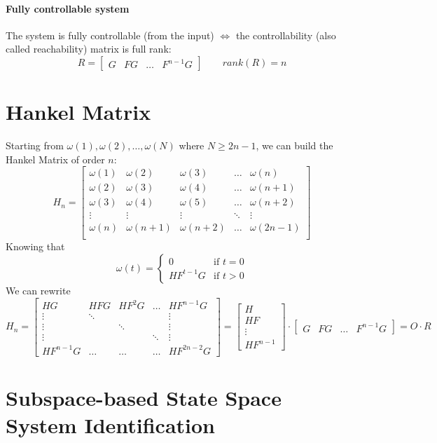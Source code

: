 \documentclass{article}
\begin{document}
\paragraph{Fully controllable system} The system is fully controllable (from the input) $\iff$ the controllability (also called reachability) matrix is full rank:
\[
R=\begin{bmatrix}
G&FG&\dots&F^{n-1}G
\end{bmatrix}
\qquad
rank(R)=n
\]

\section{Hankel Matrix}
Starting from $\omega(1),\omega(2),\dots,\omega(N)$ where $N\geq 2n-1$, we can build the Hankel Matrix of order $n$:
\[
H_n=\begin{bmatrix}
\omega(1)&\omega(2)&\omega(3)&\dots&\omega(n)\\
\omega(2)&\omega(3)&\omega(4)&\dots&\omega(n+1)\\
\omega(3)&\omega(4)&\omega(5)&\dots&\omega(n+2)\\
\vdots&\vdots&\vdots&\ddots&\vdots\\
\omega(n)&\omega(n+1)&\omega(n+2)&\dots&\omega(2n-1)\\
\end{bmatrix}
\]
Knowing that
\[
\omega(t)=
\begin{cases}
0&\text{if }t=0\\
HF^{t-1}G&\text{if }t>0
\end{cases}
\]
We can rewrite
\[
H_n=
\begin{bmatrix}
HG&HFG&HF^2G&\dots&HF^{n-1}G\\
\vdots&\ddots&&&\vdots\\
\vdots&&\ddots&&\vdots\\
\vdots&&&\ddots&\vdots\\
HF^{n-1}G&\dots&\dots&\dots&HF^{2n-2}G
\end{bmatrix}
=
\begin{bmatrix}
H\\HF\\\vdots\\HF^{n-1}
\end{bmatrix}
\cdot
\begin{bmatrix}
G&FG&\dots&F^{n-1}G
\end{bmatrix}
=
O\cdot R
\]

\section{Subspace-based State Space System Identification}
\end{document}
